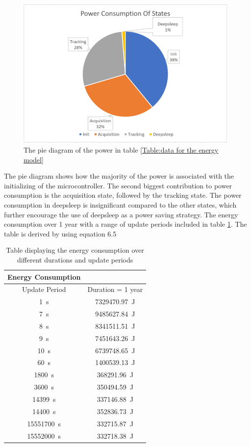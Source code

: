 \begin{figure}[H]
\centering
\includegraphics[height=7.5cm]{Project_Report/Images/Power.PNG}
\caption{The pie diagram of the power in table \ref{Table:data for the energy model}}
\label{fig:powerconsumption}
\end{figure}

The pie diagram shows how the majority of the power is associated with the initializing of the microcontroller. The second biggest contribution to power consumption is the acquisition state, followed by the tracking state. The power consumption in deepsleep is insignificant compared to the other states, which further encourage the use of deepsleep as a power saving strategy. The energy consumption over 1 year with a range of update periods included in table \ref{Table:energy}. The table is derived by using equation 6.5


\begin{table}[h!]
\begin{center}
 \begin{tabular}{||c c||} 
 \hline
 Energy Consumption & \\
 \hline
  Update Period & Duration = 1 year \\[0.5ex] 
 \hline\hline
  1 \,s & 7329470.97 \,J \\ 
 \hline
  7 \,s & 9485627.84 \,J \\
  \hline
  8 \,s & 8341511.51 \,J \\
  \hline
  9 \,s & 7451643.26 \,J \\
  \hline
  10 \,s & 6739748.65 \,J \\
 \hline
  60 \,s & 1400539.13 \,J \\
 \hline
  1800 \,s & 368291.96 \,J \\
  \hline
  3600 \,s & 350494.59 \,J \\
  \hline
  14399 \,s & 337146.88 \,J \\
  \hline
  14400 \,s & 352836.73 \,J \\
  \hline
  15551700 \,s & 332715.87 \,J \\
  \hline
  15552000 \,s & 332718.38 \,J \\[1ex]
 \hline
\end{tabular}
\end{center}
\caption{Table displaying the energy consumption over different durations and update periods}
\label{Table:energy}
\end{table}


